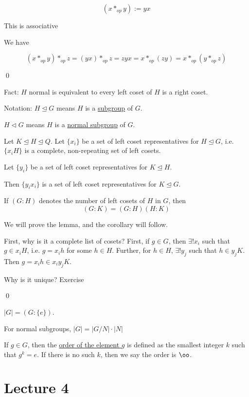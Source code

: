 \documentclass[x11names,reqno,14pt]{extarticle}
\begin{document}
\[
(x*_{op}y) := yx
\]

\claim This is associative

\proof

We have 

\[
(x*_{op}y)*_{op}z = (yx)*_{op}z = zyx = x*_{op}(zy) = x*_{op}(y*_{op}z)
\]

\qed

Fact: $H$ normal is equivalent to every left coset of $H$ is a right coset.

Notation: $H\unlhd G$ means $H$ is a \underline{subgroup} of $G$. 

$H\lhd G$ means $H$ is a \underline{normal subgroup} of $G$. 

\lem Let $K\unlhd H \unlhd Q$. Let $\{x_i\}$ be a set of left coset representatives for $H\unlhd G$, i.e. $\{x_iH\}$ is a complete, non-repeating set of left cosets. 

Let $\{y_i\}$ be a set of left coset representatives for $K\unlhd H$. 

Then $\{y_ix_i\}$ is a set of left coset representatives for $K \unlhd G$. 

\cor

If $(G:H)$ denotes the number of left cosets of $H$ in $G$, then 
\[
(G:K) = (G:H)(H:K)
\]

\proof

We will prove the lemma, and the corollary will follow. 

First, why is it a complete list of cosets? First, if $g \in G$, then $\exists ! x_i$ such that $g \in x_iH$, i.e. $g = x_ih$ for some $h \in H$. Further, for $h \in H$, $\exists!y_j$ such that $h \in y_jK$. Then $g = x_ih \in x_iy_jK$.

Why is it unique? Exercise 

\qed


$|G| = (G:\{e\})$. 

\cor

For normal subgroups, $|G| = |G/N|\cdot|N|$


If $g \in G$, then the \underline{order of the element $g$} is defined as the smallest integer $k$ such that $g^k = e$. If there is no such $k$, then we say the order is $\oo$. 

\section*{Lecture 4}
\end{document}
